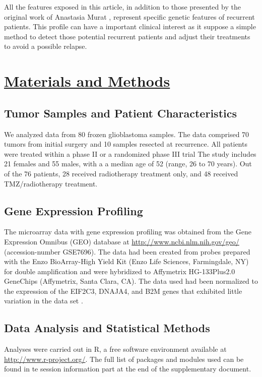 \documentclass[9pt,twocolumn,twoside]{gsajnl}
\begin{document}
All the features exposed in this article, in addition to those presented by the original work of Anastasia Murat \citep{Murat2008}, represent specific genetic features of  recurrent patients. This profile can have a important clinical interest as it suppose a simple method to detect those potential recurrent patients and adjust their treatments to avoid a possible relapse.

\section*{\underline{Materials and Methods}}

\subsection*{Tumor Samples and Patient Characteristics}

We analyzed data from 80 frozen glioblastoma samples. The data comprised 70 tumors from initial surgery and 10 samples resected at recurrence. All patients were treated within a phase II or a randomized phase III trial \citep{Stupp2002,Stupp2005}
The study includes 21 females and 55 males, with a a median age of 52 (range, 26 to 70 years). Out of the 76 patients, 28 received radiotherapy treatment only, and 48 received TMZ/radiotherapy treatment.

\subsection*{Gene Expression Profiling}

The microarray data with gene expression profiling was obtained from the Gene Expression Omnibus (GEO) database at \url{http://www.ncbi.nlm.nih.gov/geo/} (accession-number GSE7696). The data had been created from probes prepared with the Enzo BioArray-High Yield Kit (Enzo Life Sciences, Farmingdale, NY) for double amplification and were hybridized to Affymetrix HG-133Plus2.0 GeneChips (Affymetrix, Santa Clara, CA). The data used had been normalized to the expression of the EIF2C3, DNAJA4, and B2M genes that exhibited little variation in the data set \citep{Murat2008}.

\subsection*{Data Analysis and Statistical Methods}
Analyses were carried out in R, a free software environment available at \url{http://www.r-project.org/}. The full list of packages and modules used can be found in te session information part at the end of the supplementary document. 
\end{document}
